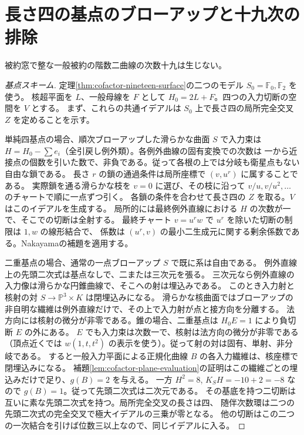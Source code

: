 \section{長さ四の基点のブローアップと十九次の排除}
\label{sec:cofactor-nineteen-clusters}
\begin{theorem}\label{thm:cofactor-exclude-nineteen}
被約窓で整な一般被約の階数二曲線の次数十九は生じない。
\end{theorem}
\begin{proof}[基点スキーム]
定理\ref{thm:cofactor-nineteen-surface}の二つのモデル $S_0=\mathbb F_0,\mathbb F_2$ を使う。
核超平面を $L$、一般母線を $F$ として $H_0=2L+F$。四つの入力切断の空間を $V$ とする。
まず、これらの共通イデアルは $S_0$ 上で長さ四の局所完全交叉 $Z$ を定めることを示す。

単純四基点の場合、順次ブローアップした滑らかな曲面 $S$ で入力束は
$H=H_0-\sum e_i$（全引戻し例外類）。各例外曲線の固有変換での次数は
一から近接点の個数を引いた数で、非負である。従って各根の上では分岐も衛星点もない自由な鎖である。
長さ $r$ の鎖の通過条件は局所座標で $(v,u^r)$ に属することである。
実際鎖を通る滑らかな枝を $v=0$ に選び、その枝に沿って $v/u,v/u^2,\dots$ のチャートで順に一点ずつ引く。
各鎖の条件を合わせて長さ四の $Z$ を取る。$V$ はこのイデアルを生成する。
局所的には最終例外直線における $H$ の次数が一で、そこでの切断は全射する。
最終チャート $v=u^r w$ で $u^r$ を除いた切断の制限は $1,w$ の線形結合で、
係数は $(u^r,v)$ の最小二生成元に関する剰余係数である。Nakayamaの補題を適用する。

二重基点の場合、通常の一点ブローアップ $S$ で既に系は自由である。
例外直線上の先頭二次式は基点なしで、二または三次元を張る。
三次元なら例外直線の入力像は滑らかな円錐曲線で、そこへの射は埋込みである。
このとき入力射と核射の対 $S\to\mathbb P^3\times K$ は閉埋込みになる。
滑らかな核曲面ではブローアップの非自明な繊維は例外直線だけで、その上で入力射が点と接方向を分離する。
法方向には核射の微分が非零である。錐の場合、二重基点は $H_0 E=1$ により負切断 $E$ の外にある。
$E$ でも入力束は次数一で、核射は法方向の微分が非零である
（頂点近くでは $w(1,t,t^2)$ の表示を使う）。従って射の対は固有、単射、非分岐である。
すると一般入力平面による正規化曲線 $B$ の各入力繊維は、核座標で閉埋込みになる。
補題\ref{lem:cofactor-plane-evaluation}の証明はこの繊維ごとの埋込みだけで足り、$g(B)=2$ を与える。
一方 $H^2=8$, $K_S H=-10+2=-8$ なので $g(B)=1$。従って先頭二次式は二次元である。
その基底を持つ二切断は互いに素な先頭二次式を持つ。局所完全交叉の長さは四、
随伴次数環は二つの先頭二次式の完全交叉で極大イデアルの三乗が零となる。
他の切断はこの二つの一次結合を引けば位数三以上なので、同じイデアルに入る。

\end{proof}
